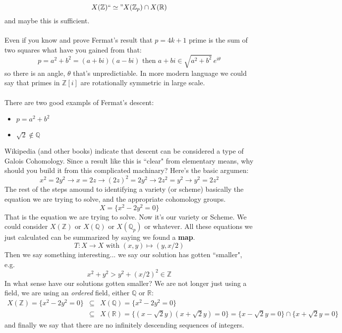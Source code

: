 \documentclass[12pt]{article}
\begin{document}
$$ X(\mathbb{Z}) ``\simeq" X(\mathbb{Z}_p) \cap X(\mathbb{R})$$
and maybe this is sufficient.  \\ \\
Even if you know and prove Fermat's result that $p = 4k+1$ prime is the sum of two squares what have you gained from that:
$$ p = a^2 + b^2 = (a+bi)(a-bi) \text{ then } a+bi \in \sqrt{a^2 + b^2}\,e^{i\theta} $$
so there is an angle, $\theta$ that's unpredictiable.  In more modern language we could say that primes in $\mathbb{Z}[i]$ are rotationally symmetric in large scale.  \\ \\
There are two good exampls of Fermat's descent:
\begin{itemize}
\item $p = a^2 + b^2$
\item $\sqrt{2} \notin \mathbb{Q}$
\end{itemize}
\newpage 
\noindent Wikipedia (and other books) indicate that descent can be considered a type of Galois Cohomology.  Since a result like this is ``clear" from elementary means, why should you build it from this complicated machinary?  Here's the basic argumen:
$$ x^2 = 2y^2 \to x = 2z \to (2z)^2 = 2y^2 \to 2z^2 = y^2 \to y^2 = 2z^2 $$ 
The rest of the steps amound to identifying a variety (or scheme) basically the equation we are trying to solve, and the appropriate cohomology groups.
$$ X = \{  x^2 - 2y^2  = 0 \}$$
That is the equation we are trying to solve.  Now it's our variety or Scheme.  We could consider $X(\mathbb{Z})$ or $X(\mathbb{Q})$ or $X(\mathbb{Q}_p)$ or whatever.  All these equations we just calculated can be summarized by saying we found a \textbf{map}. 
$$ T: X \to X \text{ with } (x,y) \mapsto (y, x/2)$$
Then we say something interesting... we say our solution has gotten ``smaller", e.g.
$$ x^2 + y^2 > y^2 + (x/2)^2 \in \mathbb{Z} $$
In what sense have our solutions gotten smaller?  We are not longer just using a field, we are using an \textit{ordered} field, either $\mathbb{Q}$ or $\mathbb{R}$:
\begin{eqnarray*} X(\mathbb{Z}) = \{  x^2 - 2y^2  = 0 \} &\subseteq&  X(\mathbb{Q}) =
\{  x^2 - 2y^2  = 0 \} \\ 
&\subseteq & X(\mathbb{R})
= \{ (x - \sqrt{2}y)(x + \sqrt{2}y) = 0 \} 
= \{  x- \sqrt{2}y = 0 \} \cap \{  x+ \sqrt{2}y = 0 \} \end{eqnarray*}
and finally we say that there are no infinitely descending sequences of integers. \\ \\
\end{document}
